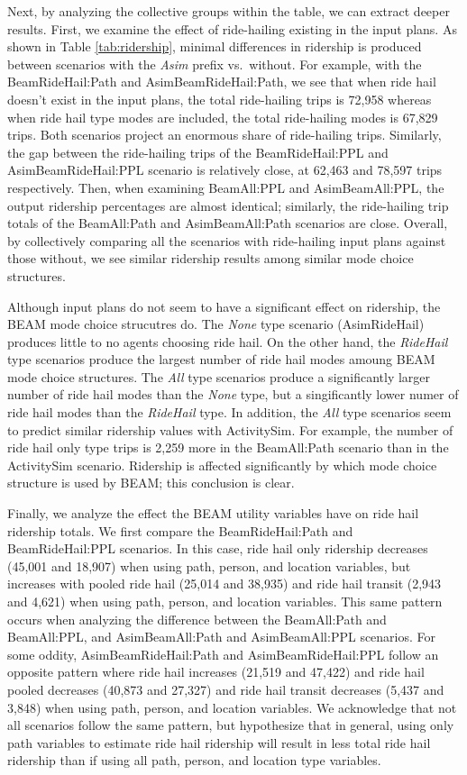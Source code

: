 \documentclass[fancy, masters]{byuthesis}
\begin{document}
Next, by analyzing the collective groups within the table, we can extract deeper results. First, we examine the effect of ride-hailing existing in the input plans. As shown in Table \ref{tab:ridership}, minimal differences in ridership is produced between scenarios with the \emph{Asim} prefix vs.~without. For example, with the BeamRideHail:Path and AsimBeamRideHail:Path, we see that when ride hail doesn't exist in the input plans, the total ride-hailing trips is 72,958 whereas when ride hail type modes are included, the total ride-hailing modes is 67,829 trips. Both scenarios project an enormous share of ride-hailing trips. Similarly, the gap between the ride-hailing trips of the BeamRideHail:PPL and AsimBeamRideHail:PPL scenario is relatively close, at 62,463 and 78,597 trips respectively. Then, when examining BeamAll:PPL and AsimBeamAll:PPL, the output ridership percentages are almost identical; similarly, the ride-hailing trip totals of the BeamAll:Path and AsimBeamAll:Path scenarios are close. Overall, by collectively comparing all the scenarios with ride-hailing input plans against those without, we see similar ridership results among similar mode choice structures.

Although input plans do not seem to have a significant effect on ridership, the BEAM mode choice strucutres do. The \emph{None} type scenario (AsimRideHail) produces little to no agents choosing ride hail. On the other hand, the \emph{RideHail} type scenarios produce the largest number of ride hail modes amoung BEAM mode choice structures. The \emph{All} type scenarios produce a significantly larger number of ride hail modes than the \emph{None} type, but a singificantly lower numer of ride hail modes than the \emph{RideHail} type. In addition, the \emph{All} type scenarios seem to predict similar ridership values with ActivitySim. For example, the number of ride hail only type trips is 2,259 more in the BeamAll:Path scenario than in the ActivitySim scenario. Ridership is affected significantly by which mode choice structure is used by BEAM; this conclusion is clear.

Finally, we analyze the effect the BEAM utility variables have on ride hail ridership totals. We first compare the BeamRideHail:Path and BeamRideHail:PPL scenarios. In this case, ride hail only ridership decreases (45,001 and 18,907) when using path, person, and location variables, but increases with pooled ride hail (25,014 and 38,935) and ride hail transit (2,943 and 4,621) when using path, person, and location variables. This same pattern occurs when analyzing the difference between the BeamAll:Path and BeamAll:PPL, and AsimBeamAll:Path and AsimBeamAll:PPL scenarios. For some oddity, AsimBeamRideHail:Path and AsimBeamRideHail:PPL follow an opposite pattern where ride hail increases (21,519 and 47,422) and ride hail pooled decreases (40,873 and 27,327) and ride hail transit decreases (5,437 and 3,848) when using path, person, and location variables. We acknowledge that not all scenarios follow the same pattern, but hypothesize that in general, using only path variables to estimate ride hail ridership will result in less total ride hail ridership than if using all path, person, and location type variables.
\end{document}
